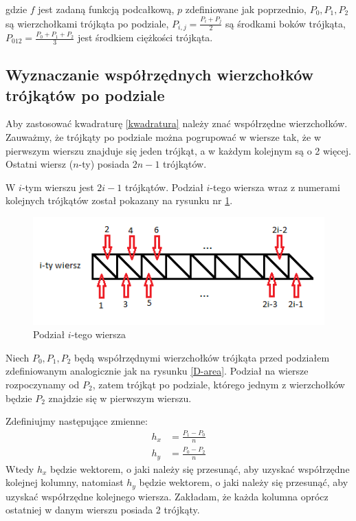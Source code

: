 \documentclass[12pt]{article}
\begin{document}
	gdzie $f$ jest zadaną funkcją podcałkową, $p$ zdefiniowane jak poprzednio, $P_0, P_1, P_2$ są wierzchołkami trójkąta po podziale, $P_{i,j} = \frac{P_i + P_j}{2}$ są środkami boków trójkąta, $P_{012} = \frac{P_0 + P_1 + P_2}{3}$ jest środkiem ciężkości trójkąta.
	
	
	\subsection{Wyznaczanie współrzędnych wierzchołków trójkątów po podziale}
	Aby zastosować kwadraturę \eqref{kwadratura} należy znać współrzędne wierzchołków. Zauważmy, że trójkąty po podziale można pogrupować w wiersze tak, że w pierwszym wierszu znajduje się jeden trójkąt, a w każdym kolejnym są o 2 więcej. Ostatni wiersz ($n$-ty) posiada $2n - 1$ trójkątów.
	
	W $i$-tym wierszu jest $2i - 1$ trójkątów. Podział $i$-tego wiersza wraz z numerami kolejnych trójkątów został pokazany na rysunku nr \ref{division-row}.
	
	\begin{figure}[H]
		\centering
		\includegraphics[]{images/division-row.png}
		\caption{Podział $i$-tego wiersza}
		\label{division-row}
	\end{figure}

	Niech $P_0, P_1, P_2$ będą współrzędnymi wierzchołków trójkąta przed podziałem zdefiniowanym analogicznie jak na rysunku \ref{D-area}. Podział na wiersze rozpoczynamy od $P_2$, zatem trójkąt po podziale, którego jednym z wierzchołków będzie $P_2$ znajdzie się w pierwszym wierszu.
	
	Zdefiniujmy następujące zmienne:
	\begin{align*}
		h_x & = \frac{P_1 - P_0}{n} \\
		h_y & = \frac{P_0 - P_2}{n}
	\end{align*}
	Wtedy $h_x$ będzie wektorem, o jaki należy się przesunąć, aby uzyskać współrzędne kolejnej kolumny, natomiast $h_y$ będzie wektorem, o jaki należy się przesunąć, aby uzyskać współrzędne kolejnego wiersza. Zakładam, że każda kolumna oprócz ostatniej w danym wierszu posiada 2 trójkąty.
	
\end{document}
